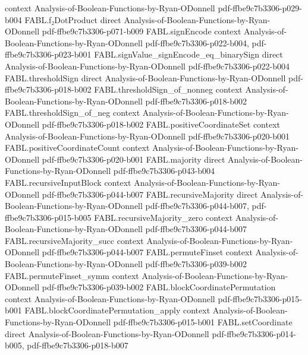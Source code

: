 \begin{theorem}
  {context}
  {Analysis-of-Boolean-Functions-by-Ryan-ODonnell}
  {pdf-ffbe9c7b3306-p029-b004}
\proofstep
  {FABL.f₂DotProduct}
  {direct}
  {Analysis-of-Boolean-Functions-by-Ryan-ODonnell}
  {pdf-ffbe9c7b3306-p071-b009}
\proofstep
  {FABL.signEncode}
  {context}
  {Analysis-of-Boolean-Functions-by-Ryan-ODonnell}
  {pdf-ffbe9c7b3306-p022-b004,
    pdf-ffbe9c7b3306-p023-b001}
\proofstep
  {FABL.signValue_signEncode_eq_binarySign}
  {direct}
  {Analysis-of-Boolean-Functions-by-Ryan-ODonnell}
  {pdf-ffbe9c7b3306-p022-b004}
\proofstep
  {FABL.thresholdSign}
  {direct}
  {Analysis-of-Boolean-Functions-by-Ryan-ODonnell}
  {pdf-ffbe9c7b3306-p018-b002}
\proofstep
  {FABL.thresholdSign_of_nonneg}
  {context}
  {Analysis-of-Boolean-Functions-by-Ryan-ODonnell}
  {pdf-ffbe9c7b3306-p018-b002}
\proofstep
  {FABL.thresholdSign_of_neg}
  {context}
  {Analysis-of-Boolean-Functions-by-Ryan-ODonnell}
  {pdf-ffbe9c7b3306-p018-b002}
\proofstep
  {FABL.positiveCoordinateSet}
  {context}
  {Analysis-of-Boolean-Functions-by-Ryan-ODonnell}
  {pdf-ffbe9c7b3306-p020-b001}
\proofstep
  {FABL.positiveCoordinateCount}
  {context}
  {Analysis-of-Boolean-Functions-by-Ryan-ODonnell}
  {pdf-ffbe9c7b3306-p020-b001}
\proofstep
  {FABL.majority}
  {direct}
  {Analysis-of-Boolean-Functions-by-Ryan-ODonnell}
  {pdf-ffbe9c7b3306-p043-b004}
\proofstep
  {FABL.recursiveInputBlock}
  {context}
  {Analysis-of-Boolean-Functions-by-Ryan-ODonnell}
  {pdf-ffbe9c7b3306-p044-b007}
\proofstep
  {FABL.recursiveMajority}
  {direct}
  {Analysis-of-Boolean-Functions-by-Ryan-ODonnell}
  {pdf-ffbe9c7b3306-p044-b007,
    pdf-ffbe9c7b3306-p015-b005}
\proofstep
  {FABL.recursiveMajority_zero}
  {context}
  {Analysis-of-Boolean-Functions-by-Ryan-ODonnell}
  {pdf-ffbe9c7b3306-p044-b007}
\proofstep
  {FABL.recursiveMajority_succ}
  {context}
  {Analysis-of-Boolean-Functions-by-Ryan-ODonnell}
  {pdf-ffbe9c7b3306-p044-b007}
\proofstep
  {FABL.permuteFinset}
  {context}
  {Analysis-of-Boolean-Functions-by-Ryan-ODonnell}
  {pdf-ffbe9c7b3306-p039-b002}
\proofstep
  {FABL.permuteFinset_symm}
  {context}
  {Analysis-of-Boolean-Functions-by-Ryan-ODonnell}
  {pdf-ffbe9c7b3306-p039-b002}
\proofstep
  {FABL.blockCoordinatePermutation}
  {context}
  {Analysis-of-Boolean-Functions-by-Ryan-ODonnell}
  {pdf-ffbe9c7b3306-p015-b001}
\proofstep
  {FABL.blockCoordinatePermutation_apply}
  {context}
  {Analysis-of-Boolean-Functions-by-Ryan-ODonnell}
  {pdf-ffbe9c7b3306-p015-b001}
\proofstep
  {FABL.setCoordinate}
  {direct}
  {Analysis-of-Boolean-Functions-by-Ryan-ODonnell}
  {pdf-ffbe9c7b3306-p014-b005,
    pdf-ffbe9c7b3306-p018-b007}

\end{theorem}
